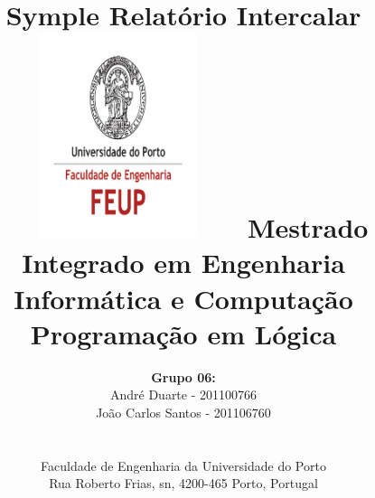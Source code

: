 \documentclass[a4paper]{article}
\begin{document}
\setlength{\textwidth}{16cm}
\setlength{\textheight}{22cm}

\title{\Huge\textbf{Symple}\linebreak\linebreak\linebreak
\Large\textbf{Relatório Intercalar}\linebreak\linebreak
\includegraphics[height=6cm, width=7cm]{feup.pdf}\linebreak \linebreak
\Large{Mestrado Integrado em Engenharia Informática e Computação} \linebreak \linebreak
\Large{Programação em Lógica}\linebreak
}

\author{\textbf{Grupo 06:}\\ André Duarte - 201100766 \\ João Carlos Santos - 201106760 \\\linebreak\linebreak \\
 \\ Faculdade de Engenharia da Universidade do Porto \\ Rua Roberto Frias, s\/n, 4200-465 Porto, Portugal \linebreak\linebreak\linebreak
\linebreak\linebreak\vspace{1cm}}
\maketitle
\thispagestyle{empty}

\end{document}
